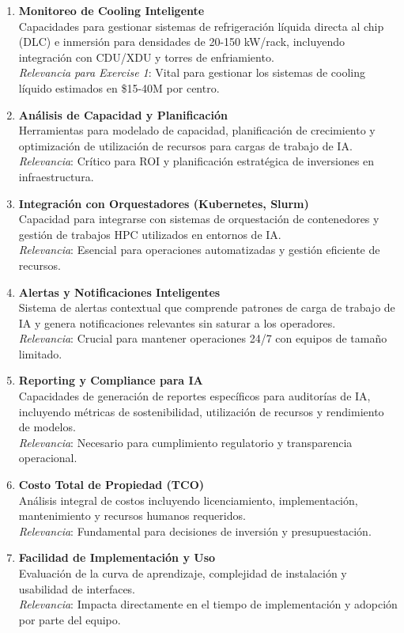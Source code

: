 \documentclass[12pt,a4paper]{article}
\begin{document}
\begin{enumerate}
    \item \textbf{Monitoreo de Cooling Inteligente}\\
    Capacidades para gestionar sistemas de refrigeración líquida directa al chip (DLC) e inmersión para densidades de 20-150 kW/rack, incluyendo integración con CDU/XDU y torres de enfriamiento.\\
    \textit{Relevancia para Exercise 1}: Vital para gestionar los sistemas de cooling líquido estimados en \$15-40M por centro.

    \item \textbf{Análisis de Capacidad y Planificación}\\
    Herramientas para modelado de capacidad, planificación de crecimiento y optimización de utilización de recursos para cargas de trabajo de IA.\\
    \textit{Relevancia}: Crítico para ROI y planificación estratégica de inversiones en infraestructura.

    \item \textbf{Integración con Orquestadores (Kubernetes, Slurm)}\\
    Capacidad para integrarse con sistemas de orquestación de contenedores y gestión de trabajos HPC utilizados en entornos de IA.\\
    \textit{Relevancia}: Esencial para operaciones automatizadas y gestión eficiente de recursos.

    \item \textbf{Alertas y Notificaciones Inteligentes}\\
    Sistema de alertas contextual que comprende patrones de carga de trabajo de IA y genera notificaciones relevantes sin saturar a los operadores.\\
    \textit{Relevancia}: Crucial para mantener operaciones 24/7 con equipos de tamaño limitado.

    \item \textbf{Reporting y Compliance para IA}\\
    Capacidades de generación de reportes específicos para auditorías de IA, incluyendo métricas de sostenibilidad, utilización de recursos y rendimiento de modelos.\\
    \textit{Relevancia}: Necesario para cumplimiento regulatorio y transparencia operacional.

    \item \textbf{Costo Total de Propiedad (TCO)}\\
    Análisis integral de costos incluyendo licenciamiento, implementación, mantenimiento y recursos humanos requeridos.\\
    \textit{Relevancia}: Fundamental para decisiones de inversión y presupuestación.

    \item \textbf{Facilidad de Implementación y Uso}\\
    Evaluación de la curva de aprendizaje, complejidad de instalación y usabilidad de interfaces.\\
    \textit{Relevancia}: Impacta directamente en el tiempo de implementación y adopción por parte del equipo.
\end{enumerate}
\end{document}
